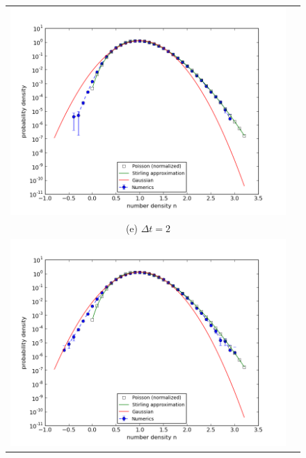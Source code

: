 \documentclass{article}
\begin{document}
\begin{figure}
\begin{tabular}{cc}
\includegraphics[width=0.5\linewidth]{fig1/1d_REACT_dt1_hist.png} \\ 
(e) $\Delta t=2$ & \\
\includegraphics[width=0.5\linewidth]{fig1/1d_REACT_dt2_hist.png} &
\end{tabular}
\caption{\label{fig_1d_REACT_hist}}
\end{figure}
\end{document}
